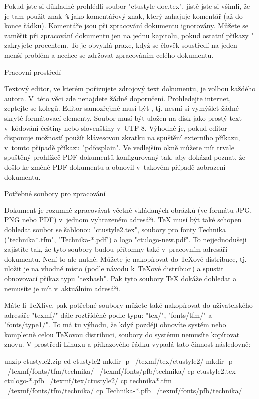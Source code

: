 Pokud jste si důkladně prohlédli soubor "ctustyle-doc.tex", jistě jste si všimli, že
je tam použit znak~{\tt\%} jako komentářový znak, který zahajuje komentář
(až do konce řádku). Komentáře jsou při zpracování dokumentu ignorovány. 
Můžete se zaměřit při zpracování dokumentu jen na jednu kapitolu, pokud ostatní
příkazy " zakryjete procentem. To je obvyklá praxe, když se
člověk soustředí na jeden menší problém a nechce se zdržovat zpracováním
celého dokumentu.


\sec Pracovní prostředí

Textový editor, ve kterém pořizujete zdrojový text dokumentu, je volbou
každého autora. V~této věci zde nenajdete žádné doporučení. Prohledejte
internet, zeptejte se kolegů. Editor samozřejmě musí být , tj. nesmí si vymýšlet žádné skryté formátovací elementy. Soubor
musí být uložen na disk jako prostý text v~kódování češtiny nebo slovenštiny 
v~UTF-8. Výhodné je, pokud editor disponuje možností použít klávesovou zkratku
na spuštění externího příkazu, v~tomto případě příkazu 
"pdfcsplain". Ve vedlejším okně můžete mít trvale spuštěný prohlížeč PDF
dokumentů konfigurovaný tak, aby dokázal poznat, že došlo ke
změně PDF dokumentu a obnovil v~takovém případě zobrazení dokumentu.

\sec Potřebné soubory pro zpracování

Dokument je rozumné zpracovávat včetně vkládaných obrázků (ve formátu JPG,
PNG nebo PDF) v~jednom vyhrazeném adresáři. \TeX{} musí být také schopen
dohledat soubor se šablonou "ctustyle2.tex", soubory pro fonty Technika 
("technika*.tfm", "Technika-*.pdf") a logo
"ctulogo-new.pdf". To nejjednodušeji zajistíte tak, že tyto soubory budou
přítomny také v~pracovním adresáři dokumentu. 
Není to ale nutné. Můžete je nakopírovat do \TeX{}ové distribuce, tj. uložit
je na vhodné místo (podle návodu k~\TeX{}ové distribuci) a spustit
obnovovací příkaz typu "texhash". Pak tyto soubory \TeX{} dokáže dohledat a
nemusíte je mít v~aktuálním adresáři.

Máte-li \TeX{}live, pak potřebné soubory můžete také nakopírovat do
uživatelského adresáře "texmf/" dále roztříděné podle typu: 
"tex/", "fonts/tfm/" a "fonts/type1/". 
To má tu výhodu, že když později obnovíte systém nebo
kompletně celou \TeX{}ovou distribuci, soubory do
systému nemusíte kopírovat znovu. V prostředí Linuxu a příkazového řádku
vypadá tato činnost následovně:

\begtt
unzip ctustyle2.zip
cd ctustyle2
mkdir -p ~/texmf/tex/ctustyle2/
mkdir -p ~/texmf/fonts/tfm/technika/ ~/texmf/fonts/pfb/technika/
cp ctustyle2.tex ctulogo-*.pfb ~/texmf/tex/ctustyle2/
cp technika*.tfm ~/texmf/fonts/tfm/technika/
cp Technika-*.pfb ~/texmf/fonts/pfb/technika/
\endtt

